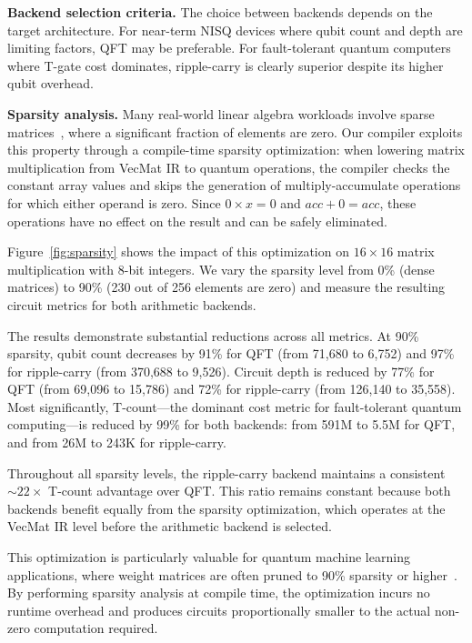 \textbf{Backend selection criteria.} The choice between backends depends on the target architecture. For near-term NISQ devices where qubit count and depth are limiting factors, QFT may be preferable. For fault-tolerant quantum computers where T-gate cost dominates, ripple-carry is clearly superior despite its higher qubit overhead.

\noindent\textbf{Sparsity analysis.}
Many real-world linear algebra workloads involve sparse matrices~\cite{sparse-ml}, where a significant fraction of elements are zero. Our compiler exploits this property through a compile-time sparsity optimization: when lowering matrix multiplication from VecMat IR to quantum operations, the compiler checks the constant array values and skips the generation of multiply-accumulate operations for which either operand is zero. Since $0 \times x = 0$ and $\mathit{acc} + 0 = \mathit{acc}$, these operations have no effect on the result and can be safely eliminated.

Figure~\ref{fig:sparsity} shows the impact of this optimization on $16 \times 16$ matrix multiplication with 8-bit integers. We vary the sparsity level from 0\% (dense matrices) to 90\% (230 out of 256 elements are zero) and measure the resulting circuit metrics for both arithmetic backends.

The results demonstrate substantial reductions across all metrics. At 90\% sparsity, qubit count decreases by 91\% for QFT (from 71,680 to 6,752) and 97\% for ripple-carry (from 370,688 to 9,526). Circuit depth is reduced by 77\% for QFT (from 69,096 to 15,786) and 72\% for ripple-carry (from 126,140 to 35,558). Most significantly, T-count---the dominant cost metric for fault-tolerant quantum computing---is reduced by 99\% for both backends: from 591M to 5.5M for QFT, and from 26M to 243K for ripple-carry.

Throughout all sparsity levels, the ripple-carry backend maintains a consistent ${\sim}22\times$ T-count advantage over QFT. This ratio remains constant because both backends benefit equally from the sparsity optimization, which operates at the VecMat IR level before the arithmetic backend is selected.

This optimization is particularly valuable for quantum machine learning applications, where weight matrices are often pruned to 90\% sparsity or higher~\cite{pruning}. By performing sparsity analysis at compile time, the optimization incurs no runtime overhead and produces circuits proportionally smaller to the actual non-zero computation required.

